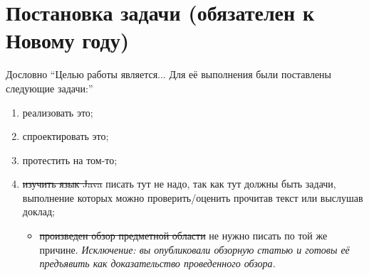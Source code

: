 
\section{Постановка задачи (обязателен к Новому году)}
\label{sec:task}
 Дословно ``Целью работы является... Для её выполнения были постав\-лены следующие задачи:''
 \begin{enumerate}
 \item  реализовать это;
 \item  спроектировать это;
 \item  протестить на том-то;
 \item \sout{изучить язык Java} писать тут не надо, так как тут должны быть задачи, выполнение которых можно проверить/оценить прочитав текст или выслушав доклад;
   \begin{itemize}
   \item \sout{произведен обзор предметной области} не нужно писать по той же причине. \emph{Исключение: вы опубликовали обзорную статью и готовы её предъявить как доказательство проведенного обзора.}
   \end{itemize}
 \end{enumerate}

